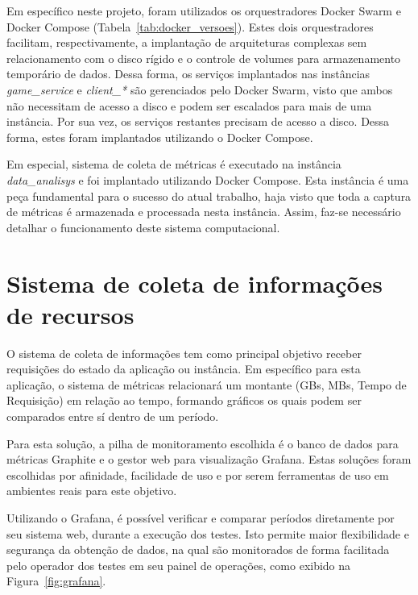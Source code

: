 Em específico neste projeto, foram utilizados os orquestradores Docker Swarm e Docker Compose (Tabela~\ref{tab:docker_versoes}).
%
Estes dois orquestradores facilitam, respectivamente, a implantação de arquiteturas complexas sem relacionamento com o disco rígido e o controle de volumes para armazenamento temporário de dados.
%
Dessa forma, os serviços implantados nas instâncias \textit{game\_service} e \textit{client\_*} são gerenciados pelo Docker Swarm, visto que ambos não necessitam de acesso a disco e podem ser escalados para mais de uma instância.
%
Por sua vez, os serviços restantes precisam de acesso a disco. 
%
Dessa forma, estes foram implantados utilizando o Docker Compose.


Em especial, sistema de coleta de métricas é executado na instância \textit{data\_analisys} e foi implantado utilizando Docker Compose.
%
Esta instância é uma peça fundamental para o sucesso do atual trabalho, haja visto que toda a captura de métricas é armazenada e processada nesta instância.
%
Assim, faz-se necessário detalhar o funcionamento deste sistema computacional.


\section{Sistema de coleta de informações de recursos}
\label{sec:informacoes}

O sistema de coleta de informações tem como principal objetivo receber requisições do estado da aplicação ou instância.
%
Em específico para esta aplicação, o sistema de métricas relacionará um montante (GBs, MBs, Tempo de Requisição) em relação ao tempo, formando gráficos os quais podem ser comparados entre sí dentro de um período.

Para esta solução, a pilha de monitoramento escolhida é o banco de dados para métricas Graphite e o gestor web para visualização Grafana. %
%
Estas soluções foram escolhidas por afinidade, facilidade de uso e por serem ferramentas de uso em ambientes reais para este objetivo.
%
% 
% 
% 

Utilizando o Grafana, é possível verificar e comparar períodos diretamente por seu sistema web, durante a execução dos testes.
%
Isto permite maior flexibilidade e segurança da obtenção de dados, na qual são monitorados de forma facilitada pelo operador dos testes em seu painel de operações, como exibido na Figura~\ref{fig:grafana}.

